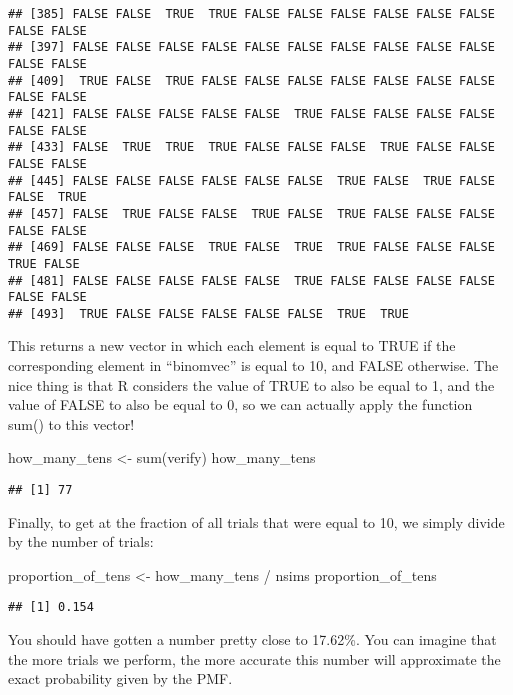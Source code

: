 \documentclass[
]{book}
\newenvironment{Shaded}{\begin{snugshade}}{\end{snugshade}}
\newcommand{\FunctionTok}[1]{\textcolor[rgb]{0.00,0.00,0.00}{#1}}
\newcommand{\NormalTok}[1]{#1}
\newcommand{\OtherTok}[1]{\textcolor[rgb]{0.56,0.35,0.01}{#1}}
\newcommand{\SpecialCharTok}[1]{\textcolor[rgb]{0.00,0.00,0.00}{#1}}
\begin{document}
\begin{verbatim}
## [385] FALSE FALSE  TRUE  TRUE FALSE FALSE FALSE FALSE FALSE FALSE FALSE FALSE
## [397] FALSE FALSE FALSE FALSE FALSE FALSE FALSE FALSE FALSE FALSE FALSE FALSE
## [409]  TRUE FALSE  TRUE FALSE FALSE FALSE FALSE FALSE FALSE FALSE FALSE FALSE
## [421] FALSE FALSE FALSE FALSE FALSE  TRUE FALSE FALSE FALSE FALSE FALSE FALSE
## [433] FALSE  TRUE  TRUE  TRUE FALSE FALSE FALSE  TRUE FALSE FALSE FALSE FALSE
## [445] FALSE FALSE FALSE FALSE FALSE FALSE  TRUE FALSE  TRUE FALSE FALSE  TRUE
## [457] FALSE  TRUE FALSE FALSE  TRUE FALSE  TRUE FALSE FALSE FALSE FALSE FALSE
## [469] FALSE FALSE FALSE  TRUE FALSE  TRUE  TRUE FALSE FALSE FALSE  TRUE FALSE
## [481] FALSE FALSE FALSE FALSE FALSE  TRUE FALSE FALSE FALSE FALSE FALSE FALSE
## [493]  TRUE FALSE FALSE FALSE FALSE FALSE  TRUE  TRUE
\end{verbatim}

This returns a new vector in which each element is equal to TRUE if the corresponding element in ``binomvec'' is equal to 10, and FALSE otherwise. The nice thing is that R considers the value of TRUE to also be equal to 1, and the value of FALSE to also be equal to 0, so we can actually apply the function sum() to this vector!

\begin{Shaded}
\begin{Highlighting}[]
\NormalTok{how\_many\_tens }\OtherTok{\textless{}{-}} \FunctionTok{sum}\NormalTok{(verify)}
\NormalTok{how\_many\_tens}
\end{Highlighting}
\end{Shaded}

\begin{verbatim}
## [1] 77
\end{verbatim}

Finally, to get at the fraction of all trials that were equal to 10, we simply divide by the number of trials:

\begin{Shaded}
\begin{Highlighting}[]
\NormalTok{proportion\_of\_tens }\OtherTok{\textless{}{-}}\NormalTok{ how\_many\_tens }\SpecialCharTok{/}\NormalTok{ nsims}
\NormalTok{proportion\_of\_tens}
\end{Highlighting}
\end{Shaded}

\begin{verbatim}
## [1] 0.154
\end{verbatim}

You should have gotten a number pretty close to 17.62\%. You can imagine that the more trials we perform, the more accurate this number will approximate the exact probability given by the PMF.
\end{document}
